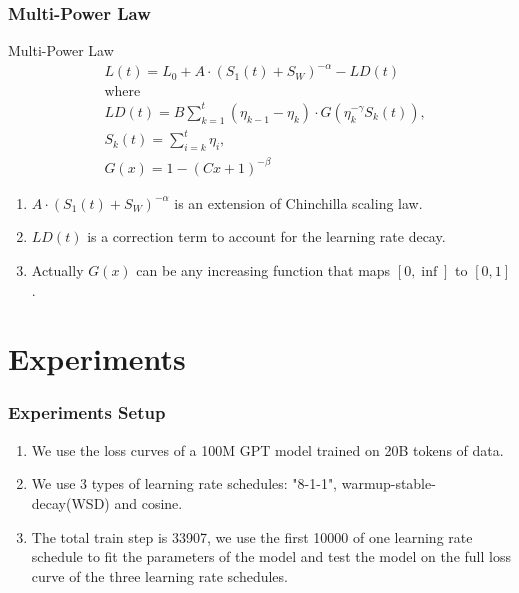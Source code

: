 \documentclass[aspectratio=169]{beamer}
\begin{document}
\begin{frame}
    \frametitle{Multi-Power Law}
    \begin{block}{Multi-Power Law}
        \begin{equation}
            \label{eq:multi_power_law}
            \begin{aligned}
                &L(t) = L_0 + A\cdot (S_1(t) + S_W)^{-\alpha} - LD(t)\\
                &\text{where} \\
                & LD(t) = B\sum_{k=1}^{t}(\eta_{k-1}-\eta_k)\cdot
                G(\eta_k^{-\gamma}S_k(t)), \\
                &S_k(t) = \sum_{i=k}^{t} \eta_i, \\
                &G(x) = 1-(Cx+1)^{-\beta}
            \end{aligned}
        \end{equation}
    \end{block}

    \begin{enumerate}
        \item $A\cdot (S_1(t) + S_W)^{-\alpha}$ is an extension of
            Chinchilla scaling law.
        \item $LD(t)$ is a correction term to account for the
            learning rate decay.
        \item Actually $G(x)$ can be any increasing function that
            maps $[0, \inf]$ to $[0, 1]$.
    \end{enumerate}
\end{frame}

\section{Experiments}\label{sec:experiments}

\begin{frame}
    \frametitle{Experiments Setup}
    \begin{enumerate}
        \item We use the loss curves of a 100M GPT model trained on
            20B tokens of data.
        \item We use 3 types of learning rate schedules: "8-1-1",
            warmup-stable-decay(WSD) and cosine.
        \item The total train step is 33907, we use the first 10000
            of one learning rate schedule to fit the parameters of
            the model and test the model on the full loss curve of
            the three learning rate schedules.
    \end{enumerate}
\end{frame}
\end{document}
